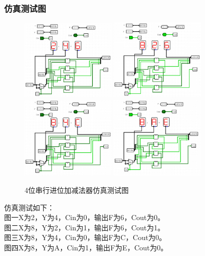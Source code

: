 \documentclass{article}
\begin{document}
    \subsubsection{仿真测试图}
    \begin{figure}[H]
    \centering
    \includegraphics[width=0.4\textwidth]{4.5.1.png}
    \includegraphics[width=0.4\textwidth]{4.5.2.png}
    \includegraphics[width=0.4\textwidth]{4.5.3.png}
    \includegraphics[width=0.4\textwidth]{4.5.4.png}
    \caption{4位串行进位加减法器仿真测试图}
    \end{figure}
    仿真测试如下：\\
    图一X为2，Y为4，Cin为0，输出F为6，Cout为0。\\
    图二X为8，Y为2，Cin为1，输出F为6，Cout为1。\\
    图三X为8，Y为4，Cin为0，输出F为C，Cout为0。\\
    图四X为8，Y为A，Cin为1，输出F为E，Cout为0。
\end{document}
